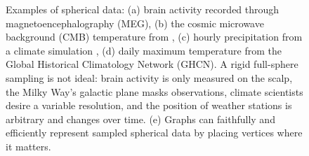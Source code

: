 \documentclass{article} %
\newcommand{\todo}[1]{{\color[rgb]{.6,.1,.6}{#1}}}
\begin{document}
\begin{figure}[h]
	\centering
	 \hspace{0.1em}
	 \hfill
	 \hfill
	 \hfill
	\caption{
		Examples of spherical data:
		(a) brain activity recorded through magnetoencephalography (MEG),\protect\footnotemark
		(b) the cosmic microwave background (CMB) temperature from \citet{planck2015overview},
		(c) hourly precipitation from a climate simulation \citep{jiang2019sphericalcnn}, %
		(d) daily maximum temperature from the Global Historical Climatology Network (GHCN).\protect\footnotemark
		A rigid full-sphere sampling is not ideal: brain activity is only measured on the scalp, the Milky Way's galactic plane masks observations, climate scientists desire a variable resolution, and the position of weather stations is arbitrary and changes over time.
		(e) Graphs can faithfully and efficiently represent sampled spherical data by placing vertices where it matters.
	}
	\label{fig:examples}
\end{figure}
\end{document}
